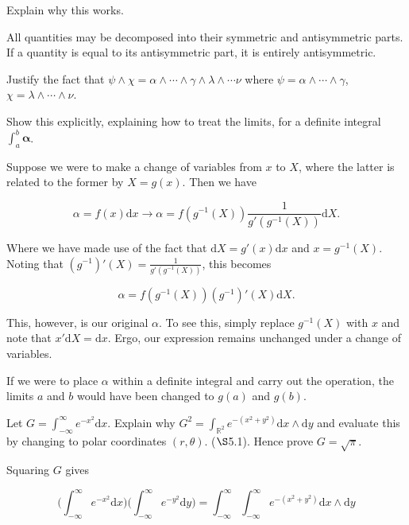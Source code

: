 \documentclass[../the-road-to-reality.tex]{subfiles}
\begin{document}
\begin{questions}
\question Explain why this works.

\begin{solution}
        All quantities may be decomposed into their symmetric and antisymmetric parts. If a quantity is equal to its antisymmetric part, it is entirely antisymmetric.
\end{solution}

\question Justify the fact that $\psi \wedge \chi = \alpha \wedge \cdots \wedge \gamma \wedge \lambda \wedge \cdots \nu$ where $\psi = \alpha \wedge \cdots \wedge \gamma$, $\chi = \lambda \wedge \cdots \wedge \nu$.

\question Show this explicitly, explaining how to treat the limits, for a definite integral $\int_a^b\mathbf{\alpha}$.

\begin{solution}
        Suppose we were to make a change of variables from $x$ to $X$, where the latter is related to the former by $X = g(x)$. Then we have

	\[
	\alpha = f(x)\mathrm{d}x \to \alpha = f(g^{-1}(X))\frac{1}{g'(g^{-1}(X))}\mathrm{d}X
	.\] 

        Where we have made use of the fact that $\mathrm{d}X = g'(x)\mathrm{d}x$ and $x = g^{-1}(X)$. Noting that $(g^{-1})'(X) = \frac{1}{g'(g^{-1}(X))}$, this becomes

	\[
        \alpha = f(g^{-1}(X))(g^{-1})'(X)\mathrm{d}X
	.\] 

        This, however, is our original $\alpha$. To see this, simply replace $g^{-1}(X)$ with $x$ and note that $x'\mathrm{d}X = \mathrm{d}x$. Ergo, our expression remains unchanged under a change of variables.

        If we were to place $\alpha$ within a definite integral and carry out the operation, the limits $a$ and $b$ would have been changed to $g(a)$ and $g(b)$.
\end{solution}

\question Let $G = \int_{-\infty}^{\infty}e^{-x^2}\mathrm{d}x$. Explain why $G^2 = \int_{\mathbb{R}^2}e^{-(x^2+y^2)}\mathrm{d}x\wedge\mathrm{d}y$ and evaluate this by changing to polar coordinates $(r, \theta)$. ($\S$5.1). Hence prove $G = \sqrt{\pi}$.

\begin{solution}
        Squaring $G$ gives

	\[
        \Big(\int_{-\infty}^{\infty}e^{-x^2}\mathrm{d}x\Big)\Big(\int_{-\infty}^{\infty}e^{-y^2}\mathrm{d}y\Big) = \int_{-\infty}^{\infty}\int_{-\infty}^{\infty}e^{-(x^2+y^2)}\mathrm{d}x\wedge\mathrm{d}y
	\] 


\end{solution}
\end{questions}
\end{document}
